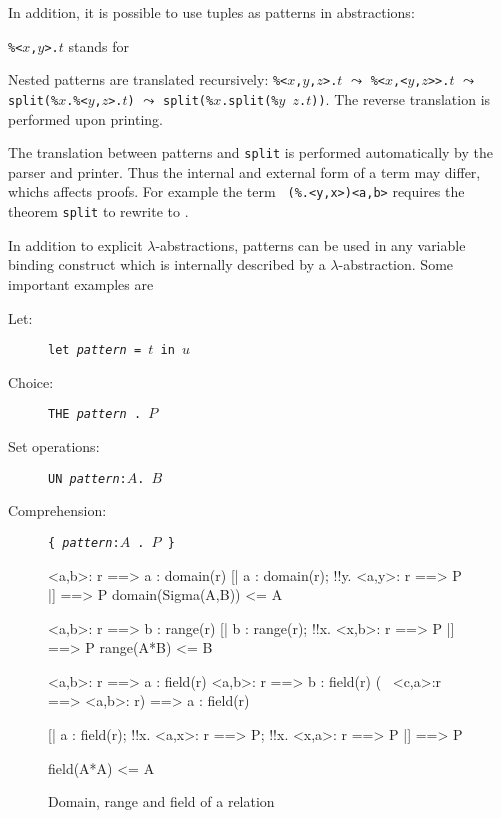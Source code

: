 In addition, it is possible to use tuples as patterns in abstractions:
\begin{center}
{\tt\%<$x$,$y$>.$t$} \quad stands for
\end{center}
Nested patterns are translated recursively:
{\tt\%<$x$,$y$,$z$>.$t$} $\leadsto$ {\tt\%<$x$,<$y$,$z$>>.$t$} $\leadsto$
{\tt split(\%$x$.\%<$y$,$z$>.$t$)} $\leadsto$ {\tt split(\%$x$.split(\%$y$
  $z$.$t$))}. The reverse translation is performed upon printing.
\begin{warn}
  The translation between patterns and {\tt split} is performed automatically
  by the parser and printer.  Thus the internal and external form of a term
  may differ, whichs affects proofs.  For example the term {\tt
    (\%<x,y>.<y,x>)<a,b>} requires the theorem {\tt split} to rewrite to
  {\tt<b,a>}.
\end{warn}
In addition to explicit $\lambda$-abstractions, patterns can be used in any
variable binding construct which is internally described by a
$\lambda$-abstraction. Some important examples are
\begin{description}
\item[Let:] {\tt let {\it pattern} = $t$ in $u$}
\item[Choice:] {\tt THE~{\it pattern}~.~$P$}
\item[Set operations:] {\tt UN~{\it pattern}:$A$.~$B$}
\item[Comprehension:] {\tt \{~{\it pattern}:$A$~.~$P$~\}}
\end{description}



\begin{figure}
\begin{ttbox}
        <a,b>: r ==> a : domain(r)
        [| a : domain(r);  !!y. <a,y>: r ==> P |] ==> P
  domain(Sigma(A,B)) <= A

         <a,b>: r ==> b : range(r)
         [| b : range(r);  !!x. <x,b>: r ==> P |] ==> P
   range(A*B) <= B

        <a,b>: r ==> a : field(r)
        <a,b>: r ==> b : field(r)
        (~ <c,a>:r ==> <a,b>: r) ==> a : field(r)

         [| a : field(r);  
                  !!x. <a,x>: r ==> P;  
                  !!x. <x,a>: r ==> P      
               |] ==> P

   field(A*A) <= A
\end{ttbox}
\caption{Domain, range and field of a relation} \label{zf-domrange}
\end{figure}

